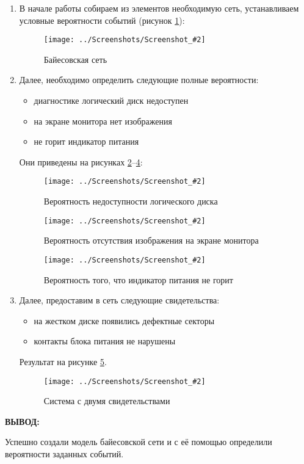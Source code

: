 \documentclass[14pt,a4paper]{extreport}
\newcommand{\sshot}[2]{\begin{figure}[ht]%
\centering\texttt{[image: ../Screenshots/Screenshot\_\#2]}%
\caption{#1}%
\label{sshot#2}%
\end{figure}%
}
\newcommand{\header}[1]{%
{
\clearpage%
\fontsize{16pt}{14pt}\selectfont
\begin{center}
\textbf{\MakeUppercase{#1}:}
\end{center}
}
}
\begin{document}
\begin{enumerate}

\item  В начале работы собираем из элементов необходимую сеть, устанавливаем условные вероятности событий (рисунок \ref{sshot1}):

\sshot{Байесовская сеть}{1}

\clearpage

\item Далее, необходимо определить следующие полные вероятности:

\begin{itemize}

\item диагностике логический диск недоступен
\item на экране монитора нет изображения
\item не горит индикатор питания

\end{itemize}

Они приведены на рисунках \ref{sshot2}--\ref{sshot4}:

\sshot{Вероятность недоступности логического диска}{2}
\sshot{Вероятность отсутствия изображения на экране монитора}{3}
\sshot{Вероятность того, что индикатор питания не горит}{4}

\clearpage

\item Далее, предоставим в сеть следующие свидетельства:

\begin{itemize}

\item на жестком диске появились дефектные секторы

\item контакты блока питания не нарушены

\end{itemize}

Результат на рисунке \ref{sshot5}.

\sshot{Система с двумя свидетельствами}{5}

\end{enumerate}

\header{Вывод}

Успешно создали модель байесовской сети и с её помощью определили вероятности заданных событий.
\end{document}

